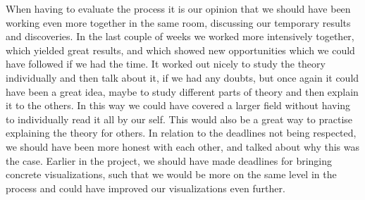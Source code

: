 \documentclass[Report.tex]{subfiles}
\begin{document}
When having to evaluate the process it is our opinion that we should have been working even more together in the same room, discussing our temporary results and discoveries. In the last couple of weeks we worked more intensively together, which yielded great results, and which showed new opportunities which we could have followed if we had the time. It worked out nicely to study the theory individually and then talk about it, if we had any doubts, but once again it could have been a great idea, maybe to study different parts of theory and then explain it to the others. In this way we could have covered a larger field without having to individually read it all by our self. This would also be a great way to practise explaining the theory for others. In relation to the deadlines not being respected, we should have been more honest with each other, and talked about why this was the case. Earlier in the project, we should have made deadlines for bringing concrete visualizations, such that we would be more on the same level in the process and could have improved our visualizations even further.
\thispagestyle{empty}
\end{document}

